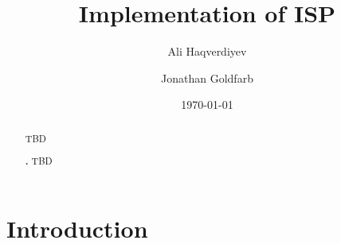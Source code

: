 \documentclass[letterpaper, 10pt]{amsart}
\let\institute\address%
\theoremstyle{definition}
\theoremstyle{remark}
\begin{document}
\title{Implementation of ISP}
\author{Ali Haqverdiyev \and Jonathan Goldfarb}
\institute{Department of Mathematical Sciences\\Florida Institute of
    Technology\\Melbourne, FL 32901}
\date{\today}

\begin{abstract}
    TBD

    \smallskip%
    \noindent\textbf{\keywordsname.} TBD
\end{abstract}
\maketitle

\tableofcontents{}

\section{Introduction}\label{sec:introduction}
\end{document}

